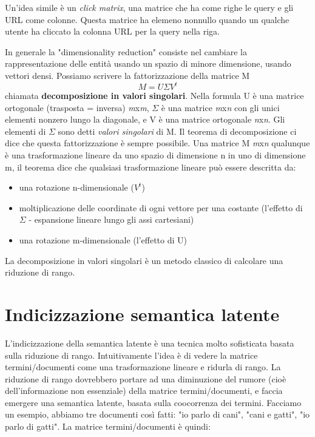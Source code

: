 \documentclass[12pt,italian]{report}
\begin{document}
Un'idea simile è un \textit{click matrix}, una matrice che ha come righe le query e gli URL come colonne. Questa matrice ha elemeno nonnullo quando un qualche utente ha cliccato la colonna URL per la query nella riga. 

In generale la "dimensionality reduction" consiste nel cambiare la rappresentazione delle entità usando un spazio di minore dimensione, usando vettori densi. 
\bigbreak
\noindent Possiamo scrivere la fattorizzazione della matrice M
\begin{equation}
    M = U \Sigma V^t
\end{equation}
chiamata \textbf{decomposizione in valori singolari}.
Nella formula U è una matrice ortogonale (trasposta = inversa) \textit{m}x\textit{m}, $\Sigma$ è una matrice \textit{m}x\textit{n} con gli unici elementi nonzero lungo la diagonale, e V è una matrice ortogonale \textit{n}x\textit{n}.
Gli elementi di $\Sigma$ sono detti \textit{valori singolari} di M. Il teorema di decomposizione ci dice che questa fattorizzazione è sempre possibile.
\bigbreak
Una matrice M \textit{m}x\textit{n} qualunque è una trasformazione lineare da uno spazio di dimensione n in uno di dimensione m, il teorema dice che qualsiasi trasformazione lineare può essere descritta da:
\begin{itemize}
    \item una rotazione n-dimensionale ($V^t$)
    \item moltiplicazione delle coordinate di ogni vettore per una costante (l'effetto di $\Sigma$ - espansione lineare lungo gli assi cartesiani)
    \item una rotazione m-dimensionale (l'effetto di U)
\end{itemize}
La decomposizione in valori singolari è un metodo classico di calcolare una riduzione di rango.

\section{Indicizzazione semantica latente}
\label{indlatente}
L'indicizzazione della semantica latente è una tecnica molto sofisticata basata sulla riduzione di rango. Intuitivamente l'idea è di vedere la matrice termini/documenti come una trasformazione lineare e ridurla di rango. La riduzione di rango dovrebbero portare ad una diminuzione del rumore (cioè dell'informazione non essenziale) della matrice termini/documenti, e faccia emergere una semantica latente, basata sulla coocorrenza dei termini.
\bigbreak
Facciamo un esempio, abbiamo tre documenti così fatti: "io parlo di cani", "cani e gatti", "io parlo di gatti". La matrice termini/documenti è quindi:
\end{document}
